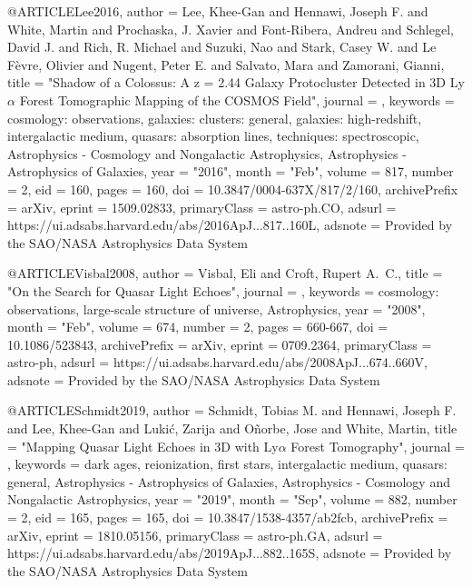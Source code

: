 \documentclass{aa}
\begin{document}
{{{{{{{{{{{{{{@ARTICLE{Lee2016,
       author = {{Lee}, Khee-Gan and {Hennawi}, Joseph F. and {White}, Martin and
         {Prochaska}, J. Xavier and {Font-Ribera}, Andreu and
         {Schlegel}, David J. and {Rich}, R. Michael and {Suzuki}, Nao and
         {Stark}, Casey W. and {Le F{\`e}vre}, Olivier and {Nugent}, Peter E. and
         {Salvato}, Mara and {Zamorani}, Gianni},
        title = "{Shadow of a Colossus: A z = 2.44 Galaxy Protocluster Detected in 3D Ly{\ensuremath{\alpha}} Forest Tomographic Mapping of the COSMOS Field}",
      journal = {\apj},
     keywords = {cosmology: observations, galaxies: clusters: general, galaxies: high-redshift, intergalactic medium, quasars: absorption lines, techniques: spectroscopic, Astrophysics - Cosmology and Nongalactic Astrophysics, Astrophysics - Astrophysics of Galaxies},
         year = "2016",
        month = "Feb",
       volume = {817},
       number = {2},
          eid = {160},
        pages = {160},
          doi = {10.3847/0004-637X/817/2/160},
archivePrefix = {arXiv},
       eprint = {1509.02833},
 primaryClass = {astro-ph.CO},
       adsurl = {https://ui.adsabs.harvard.edu/abs/2016ApJ...817..160L},
      adsnote = {Provided by the SAO/NASA Astrophysics Data System}
}

@ARTICLE{Visbal2008,
       author = {{Visbal}, Eli and {Croft}, Rupert A.~C.},
        title = "{On the Search for Quasar Light Echoes}",
      journal = {\apj},
     keywords = {cosmology: observations, large-scale structure of universe, Astrophysics},
         year = "2008",
        month = "Feb",
       volume = {674},
       number = {2},
        pages = {660-667},
          doi = {10.1086/523843},
archivePrefix = {arXiv},
       eprint = {0709.2364},
 primaryClass = {astro-ph},
       adsurl = {https://ui.adsabs.harvard.edu/abs/2008ApJ...674..660V},
      adsnote = {Provided by the SAO/NASA Astrophysics Data System}
}

@ARTICLE{Schmidt2019,
       author = {{Schmidt}, Tobias M. and {Hennawi}, Joseph F. and {Lee}, Khee-Gan and
         {Luki{\'c}}, Zarija and {O{\~n}orbe}, Jose and {White}, Martin},
        title = "{Mapping Quasar Light Echoes in 3D with Ly{\ensuremath{\alpha}} Forest Tomography}",
      journal = {\apj},
     keywords = {dark ages, reionization, first stars, intergalactic medium, quasars: general, Astrophysics - Astrophysics of Galaxies, Astrophysics - Cosmology and Nongalactic Astrophysics},
         year = "2019",
        month = "Sep",
       volume = {882},
       number = {2},
          eid = {165},
        pages = {165},
          doi = {10.3847/1538-4357/ab2fcb},
archivePrefix = {arXiv},
       eprint = {1810.05156},
 primaryClass = {astro-ph.GA},
       adsurl = {https://ui.adsabs.harvard.edu/abs/2019ApJ...882..165S},
      adsnote = {Provided by the SAO/NASA Astrophysics Data System}
} 

}}}}}}}}}}}}}}
\end{document}
